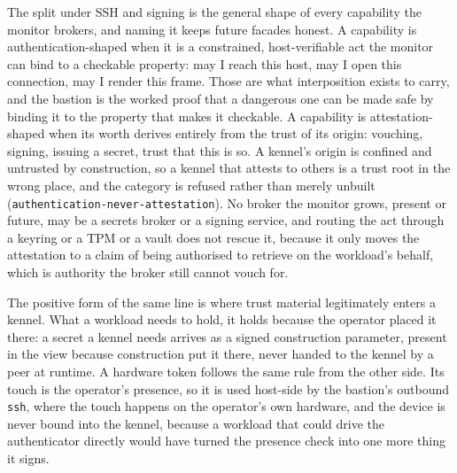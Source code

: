 The split under SSH and signing is the general shape of every capability
the monitor brokers, and naming it keeps future facades honest. A
capability is authentication-shaped when it is a constrained,
host-verifiable act the monitor can bind to a checkable property: may I
reach this host, may I open this connection, may I render this frame.
Those are what interposition exists to carry, and the bastion is the
worked proof that a dangerous one can be made safe by binding it to the
property that makes it checkable. A capability is attestation-shaped
when its worth derives entirely from the trust of its origin: vouching,
signing, issuing a secret, trust that this is so. A kennel's origin is
confined and untrusted by construction, so a kennel that attests to
others is a trust root in the wrong place, and the category is refused
rather than merely unbuilt (\texttt{authentication-never-attestation}).
No broker the monitor grows, present or future, may be a secrets broker
or a signing service, and routing the act through a keyring or a TPM or
a vault does not rescue it, because it only moves the attestation to a
claim of being authorised to retrieve on the workload's behalf, which is
authority the broker still cannot vouch for.

The positive form of the same line is where trust material legitimately
enters a kennel. What a workload needs to hold, it holds because the
operator placed it there: a secret a kennel needs arrives as a signed
construction parameter, present in the view because construction put it
there, never handed to the kennel by a peer at runtime. A hardware token
follows the same rule from the other side. Its touch is the operator's
presence, so it is used host-side by the bastion's outbound
\texttt{ssh}, where the touch happens on the operator's own hardware,
and the device is never bound into the kennel, because a workload that
could drive the authenticator directly would have turned the presence
check into one more thing it signs.
